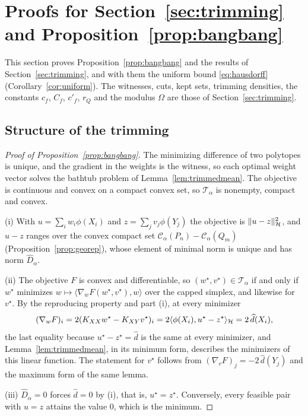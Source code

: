 \section{Proofs for Section~\ref{sec:trimming} and Proposition~\ref{prop:bangbang}}
\label{app:trimming}

This section proves Proposition~\ref{prop:bangbang} and the results of Section~\ref{sec:trimming}, and with them the
uniform bound \eqref{eq:hausdorff} (Corollary~\ref{cor:uniform}). The witnesses, cuts, kept sets, trimming densities,
the constants $c_f$, $C_f$, $c'_f$, $r_Q$ and the modulus $\Omega$ are those of Section~\ref{sec:trimming}.

\subsection{Structure of the trimming}

\begin{proof}[Proof of Proposition~\ref{prop:bangbang}]
The minimizing difference of two polytopes is unique, and the gradient in the weights is the witness, so each
optimal weight vector solves the bathtub problem of Lemma~\ref{lem:trimmedmean}. The objective is continuous and convex
on a compact convex set, so $\mathcal T_\alpha$ is nonempty, compact and convex.

(i) With $u=\sum_iw_i\phi(X_i)$ and $z=\sum_jv_j\phi(Y_j)$ the objective is $\|u-z\|_{\mathcal{H}}^2$, and $u-z$ ranges over the
convex compact set $\mathcal C_\alpha(P_n)-\mathcal C_\alpha(Q_m)$ (Proposition~\ref{prop:georep}), whose element of
minimal norm is unique and has norm $\widehat D_\alpha$.

(ii) The objective $F$ is convex and differentiable, so $(w^\star,v^\star)\in\mathcal T_\alpha$ if and only if $w^\star$ minimizes $w\mapsto\langle\nabla_wF(w^\star,v^\star),w\rangle$ over the capped simplex, and likewise for $v^\star$. By the reproducing property and part (i), at every minimizer
\[
(\nabla_wF)_i=2(K_{XX}w^\star-K_{XY}v^\star)_i=2\langle\phi(X_i),u^\star-z^\star\rangle_{\mathcal{H}}=2\,\widehat d(X_i),
\]
the last equality because $u^\star-z^\star=\widehat d$ is the same at every minimizer, and Lemma~\ref{lem:trimmedmean}, in its
minimum form, describes the minimizers of this linear function. The statement for $v^\star$ follows from $(\nabla_vF)_j=-2\,\widehat d(Y_j)$ and the maximum form
of the same lemma.

(iii) $\widehat D_\alpha=0$ forces $\widehat d=0$ by (i), that is, $u^\star=z^\star$. Conversely, every feasible pair
with $u=z$ attains the value $0$, which is the minimum.
\end{proof}

